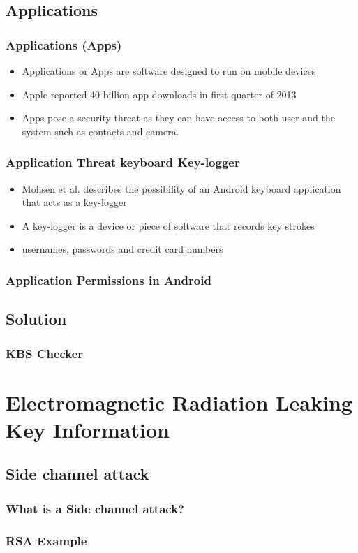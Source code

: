 \documentclass{beamer}
\begin{document}
	\subsection{Applications}
		\begin{frame}
		\frametitle{Applications (Apps)}
		\begin{itemize}
		\item Applications or Apps are software designed to run on mobile devices 
		\item Apple reported 40 billion app downloads in first quarter of 2013 
		\item Apps pose a security threat as they can have access to both user and the system such as contacts and camera.
		\end{itemize}
		\end{frame}
		\begin{frame}
		\frametitle{Application Threat keyboard Key-logger}
		\begin{itemize}
		\item Mohsen et al. describes the possibility of an Android keyboard application that acts as a key-logger
		\item A key-logger is a device or piece of software that records key strokes
		\item usernames, passwords and credit card numbers  
		\end{itemize}
		\end{frame}
		\begin{frame}
		\frametitle{Application Permissions in Android}
		\end{frame}
		
	\subsection{Solution}
		\begin{frame}
		\frametitle{KBS Checker}
		\end{frame}
\section{Electromagnetic Radiation Leaking Key Information}
	\subsection{Side channel attack}
		\begin{frame}
		\frametitle{What is a Side channel attack?}
		\end{frame}
		\begin{frame}
		\frametitle{RSA Example}
		\end{frame}
\end{document}
